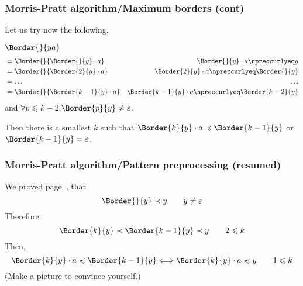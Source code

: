 %
\begin{frame}
\frametitle{Morris-Pratt algorithm/Maximum borders (cont)}

Let us try now the following.

\bigskip

\(\Border{}{ya}\)
\begin{align*}
&= \Border{}{\Border{}{y} \cdot a}
                &  \Border{}{y} \cdot a \npreccurlyeq y\\
                &= \Border{}{\Border{2}{y} \cdot a}
                &  \Border{2}{y} \cdot a \npreccurlyeq \Border{}{y}\\
                &= \ldots
                & \ldots\\
                &= \Border{}{\Border{k-1}{y} \cdot a}
                & \Border{k-1}{y} \cdot a \npreccurlyeq \Border{k-2}{y}
\end{align*}
and \(\forall p \leqslant k-2.\Border{p}{y} \neq \varepsilon\).

\bigskip

\noindent Then there is a smallest \(k\) such that \(\Border{k}{y}
\cdot a \preccurlyeq \Border{k-1}{y}\) or \(\Border{k-1}{y} =
\varepsilon\).

\end{frame}

%
\begin{frame}
\frametitle{Morris-Pratt algorithm/Pattern preprocessing (resumed)}

We proved page~\pageref{decreasing_borders_proof}, that
\[
\Border{}{y} \prec y \qquad y \neq \varepsilon
\]
Therefore
\[
\Border{k}{y} \prec \Border{k-1}{y} \prec y
\qquad 2 \leqslant k
\]
Then, 
\[
\Border{k}{y} \cdot a \preccurlyeq \Border{k-1}{y}
\Longleftrightarrow
\Border{k}{y} \cdot a \preccurlyeq y
\qquad 1 \leqslant k
\]
(Make a picture to convince yourself.)

\end{frame}

